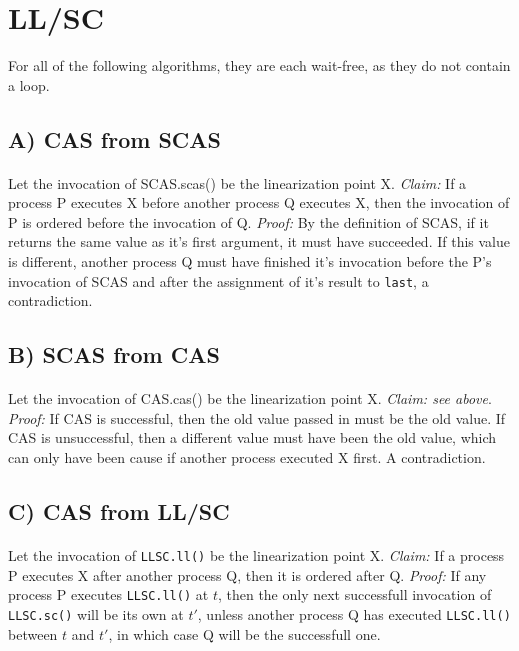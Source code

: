 \documentclass[11pt]{article}
\begin{document}
\maketitle

\section{LL/SC}


For all of the following algorithms, they are each wait-free, as they do not contain a loop.
\subsection*{A) CAS from SCAS}

\paragraph{} Let the invocation of SCAS.scas() be the linearization point X. \textit{Claim:} If a process P executes X before another process Q executes X, then the invocation of P is ordered before the invocation of Q. \textit{Proof:} By the definition of SCAS, if it returns the same value as it's first argument, it must have succeeded. If this value is different, another process Q must have finished it's invocation before the P's invocation of SCAS and after the assignment of it's result to \texttt{last}, a contradiction.

\pagebreak
\subsection*{B) SCAS from CAS}

\paragraph{} Let the invocation of CAS.cas() be the linearization point X. \textit{Claim: see above}. \textit{Proof:} If CAS is successful, then the old value passed in must be the old value. If CAS is unsuccessful, then a different value must have been the old value, which can only have been cause if another process executed X first. A contradiction.

\subsection*{C) CAS from LL/SC} 

\paragraph{} Let the invocation of \texttt{LLSC.ll()} be the linearization point X. \textit{Claim:} If a process P executes X after another process Q, then it is ordered after Q. \textit{Proof:} If any process P executes \texttt{LLSC.ll()} at $t$, then the only next successfull invocation of \texttt{LLSC.sc()} will be its own at $t'$, unless another process Q has executed \texttt{LLSC.ll()} between $t$ and $t'$, in which case Q will be the successfull one.
\end{document}
